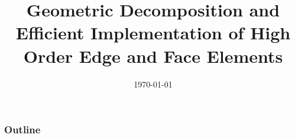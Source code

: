 \documentclass{beamer}
\title{Geometric Decomposition and Efficient Implementation of High Order Edge and Face Elements}
\author{}
\date{\today }
\institute{ }
\begin{document}
\frame{\titlepage}
\begin{frame}
\frametitle{Outline}
\tableofcontents
\end{frame}
\end{document}
